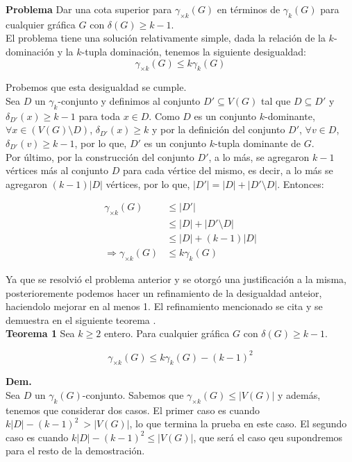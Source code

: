 \documentclass{article}
\begin{document}
\textbf{Problema} Dar una cota superior para $\gamma_{\times k}(G)$ en términos de $\gamma_k(G)$ para cualquier gráfica $G$ con $\delta(G)\geq k-1$.\\

El problema tiene una solución relativamente simple, dada la relación de la $k$-dominación y la $k$-tupla dominación, tenemos la siguiente desigualdad:\\

$$\gamma_{\times k}(G)\leq k\gamma_k(G)$$

Probemos que esta desigualdad se cumple.\\
Sea $D$ un $\gamma_k$-conjunto y definimos al conjunto $D'\subseteq V(G)$ tal que $D\subseteq D'$ y $\delta_{D'}(x) \geq k-1$ para toda $x\in D$. Como $D$ es un conjunto $k$-dominante, $\forall x \in (V(G)\setminus D)$, $\delta_{D'}(x)\geq k$ y por la definición del conjunto $D'$, $\forall v\in D$, $\delta_{D'}(v)\geq k-1$, por lo que, $D'$ es un conjunto $k$-tupla dominante de $G$.\\


Por último, por la construcción del conjunto $D'$, a lo más, se agregaron $k-1$ vértices más al conjunto $D$ para cada vértice del mismo, es decir, a lo más se agregaron $(k-1)|D|$ vértices, por lo que, $|D'|=|D|+|D'\setminus D|$. Entonces:

\begin{align*}
\gamma_{\times k}(G)&\leq |D'|\\
&\leq |D|+|D'\setminus D|\\
&\leq |D|+(k-1)|D|\\
\Longrightarrow \gamma_{\times k}(G)&\leq k\gamma_k(G)
\end{align*}


Ya que se resolvió el problema anterior y se otorgó una justificación a la misma, posterioremente podemos hacer un refinamiento de la desigualdad anteior, haciendolo mejorar en al menos 1. El refinamiento mencionado se cita y se demuestra en el siguiente teorema \cite{cabrera2022note}.\\

\textbf{Teorema 1} Sea $k \geq 2$ entero. Para cualquier gráfica $G$ con $\delta(G) \geq k-1$.

$$\gamma_{\times k}(G) \leq k\gamma_{k}(G)-(k-1)^2$$

\textbf{Dem.}\\

Sea $D$ un $\gamma_k(G)$-conjunto. Sabemos que $\gamma_{\times k}(G)\leq |V(G)|$ y además, tenemos que considerar dos casos. El primer caso es cuando $k|D|-(k-1)^2\ > |V(G)|$, lo que termina la prueba en este caso. El segundo caso  es cuando $k|D|-(k-1)^2\leq |V(G)|$, que será el caso qeu supondremos para el resto de la demostración.\\
\end{document}
